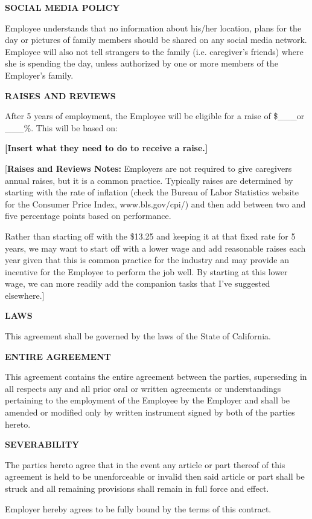 \documentclass[]{article}
\begin{document}
\textbf{SOCIAL MEDIA POLICY}

Employee understands that no information about his/her location, plans
for the day or pictures of family members should be shared on any social
media network. Employee will also not tell strangers to the family (i.e.
caregiver's friends) where she is spending the day, unless authorized by
one or more members of the Employer's family.

\textbf{RAISES AND REVIEWS}

After 5 years of employment, the Employee will be eligible for a raise
of \$\_\_\_or \_\_\_\%. This will be based on:

\textbf{{[}Insert what they need to do to receive a raise.{]}}

{[}\textbf{Raises and Reviews Notes:} Employers are not required to give
caregivers annual raises, but it is a common practice. Typically raises
are determined by starting with the rate of inflation (check the Bureau
of Labor Statistics website for the Consumer Price Index,
www.bls.gov/cpi/) and then add between two and five percentage points
based on performance.

Rather than starting off with the \$13.25 and keeping it at that fixed
rate for 5 years, we may want to start off with a lower wage and add
reasonable raises each year given that this is common practice for the
industry and may provide an incentive for the Employee to perform the
job well. By starting at this lower wage, we can more readily add the
companion tasks that I've suggested elsewhere.{]}

\textbf{LAWS}

This agreement shall be governed by the laws of the State of California.

\textbf{ENTIRE AGREEMENT}

This agreement contains the entire agreement between the parties,
superseding in all respects any and all prior oral or written agreements
or understandings pertaining to the employment of the Employee by the
Employer and shall be amended or modified only by written instrument
signed by both of the parties hereto.

\textbf{SEVERABILITY}

The parties hereto agree that in the event any article or part thereof
of this agreement is held to be unenforceable or invalid then said
article or part shall be struck and all remaining provisions shall
remain in full force and effect.

Employer hereby agrees to be fully bound by the terms of this contract.
\end{document}
